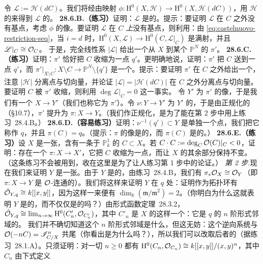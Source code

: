 令 $\mathscr{L}:=\mathscr{H}(dC)$。我们将经由映射 $\phi\colon\mathrm{H}^0(X,\mathscr{H})\to\mathrm{H}^0(X,\mathscr{H}(dC))$，用 $\mathscr{H}$ 的\trSection{}来得到 $\mathscr{L}$ 的\trSection。
\textbf{28.6.B.（练习）}\quad 证明：$\mathscr{L}$ 是\trBasePointFree{}的。提示：要证明 $\mathscr{L}$ 在 $C$ 之外没有基点，考虑 $\phi$ 的像。要证明 $\mathscr{L}$ 在 $C$ \emph{上}没有基点，则利用：由 \eqref{eq:castelnuovo-restriction-seq}，当 $i=d$ 时，$\mathrm{H}^0(X,\mathscr{L})\to\mathrm{H}^0(C,\mathscr{L}|_C)$ 是满射，并且 $\mathscr{L}|_C\cong\mathcal{O}_C$。
于是，完全线性系 $|\mathscr{L}|$ 给出一个从 $X$ 到某个\trProjectiveSpace{} $\mathbb{P}^N$ 的\trMorphism{} $\pi'$。
\textbf{28.6.C.（练习）}\quad 证明：$\pi'$ 恰好把 $C$ 收缩为一点 $q'$。更明确地说，证明：$\pi'$ 把 $C$ 送到一点 $q'$，而 $\pi'|_{X\setminus C}\colon X\setminus C\to\mathbb{P}^N\setminus\{q'\}$ 是一个\trClosedEmbedding。提示：要证明 $\pi'$ 在 $C$ 之外给出一个\trClosedEmbedding，注意 $|\mathscr{H}|$ 分离点与切向量，并论证 $|\mathscr{L}|=|\mathscr{H}(dC)|$ 在 $C$ 之外分离点与切向量。要证明 $C$ 被 $\pi'$ 收缩，则利用 $\deg\mathscr{L}|_C=0$ 这一事实。
令 $Y'$ 为 $\pi'$ 的像，于是我们有一个\trMorphism{} $X\to Y'$（我们也称它为 $\pi'$）。令 $\nu\colon Y\to Y'$ 为 $Y'$ 的\trNormalization，于是由正规化的\trUniversalProperty{}（\S10.7），$\pi'$ 提升为 $\pi\colon X\to Y$。（我们作正规化，是为了能在第 2 步中用上\mbox{练习~28.4.B}。）
\textbf{28.6.D.（容易练习）}\quad 证明：$\nu^{-1}(q')\subset Y$ 是单独一个点，我们把它称作 $q$，并且 $\pi(C)=q$。（提示：$\pi$ 的像是\trClosed{}的，而 $\pi(C)$ 是\trConnected{}的。）
\textbf{28.6.E.（练习）}\quad 设 $X$ 是一张\trSmooth\trProjective{}\trSurface，含有一条\trIsomorphic{}于 $\mathbb{P}^1_k$ 的\trCurve{} $C\subset X$。若 $C\cdot C:=\deg_C\mathcal{O}(C)|_C<0$，证明：存在一个\trMorphism{} $\pi\colon X\to X'$，它把 $C$ 收缩为一点，而让 $X$ 的其余部分保持不变。（这条练习不会被用到，收在这里是为了让人练习第 1 步中的论证。）
\emph{第 2 步.}\quad 现在我们来证明 $Y$ 是一张\trSmooth\trSurface。由于 $Y$ 是\trNormal{}的，由\mbox{练习~28.4.B}，我们有 $\pi_*\mathcal{O}_X\cong\mathcal{O}_Y$（即 $\pi\colon X\to Y$ 是 $\mathcal{O}$-连通的）。我们将这样来证明 $Y$ 在 $q$ 处\trSmooth：证明作为拓扑环有 $\hat{\mathcal{O}}_{Y,q}\cong k[[x,y]]$，因为这样一来便有 $\dim_k(\mathfrak{m}/\mathfrak{m}^2)=2$。（你明白为什么这就表明 $Y$ 是\trSmooth{}的，而不仅仅是\trRegular{}的吗？）由\mbox{形式函数定理~28.3.2}，$\hat{\mathcal{O}}_{Y,q}\cong\lim_{n\to\infty}\mathrm{H}^0(C'_n,\mathcal{O}_{C'_n})$，其中 $C'_n$ 是 $X$ 的这样一个\trClosedSubscheme：它是 $q$ 的 $n$ 阶形式邻域的\trSchemeTheoreticPreimage。
我们并不确切知道这个 $n$ 阶形式邻域是什么，但这无妨：这个逆向系统与 $\mathcal{O}(-nC)=\mathscr{I}^n_{C/X}$ 共尾（你看出是为什么吗？），所以我们可以改取后者的\trInverseLimit{}（据\mbox{练习~28.1.A}）。只须证明：对一切 $n\ge 0$ 都有 $\mathrm{H}^0(C_n,\mathcal{O}_{C_n})\cong k[[x,y]]/(x,y)^n$，其中 $C_n$ 由下式定义
